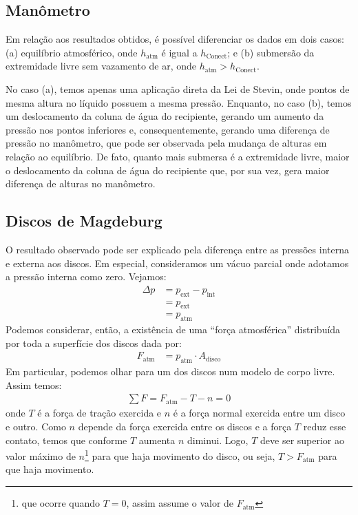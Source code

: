 \subsection{Manômetro}

Em relação aos resultados obtidos, é possível diferenciar os dados em dois
casos: (a) equilíbrio atmosférico, onde \( h_{\text{atm}} \) é igual a \(
h_{\text{Conect}} \); e (b) submersão da extremidade livre sem vazamento de ar,
onde \( h_{\text{atm}} > h_{\text{Conect}}\). 

No caso (a), temos apenas uma aplicação direta da Lei de Stevin, onde pontos de
mesma altura no líquido possuem a mesma pressão. Enquanto, no caso (b), temos um
deslocamento da coluna de água do recipiente, gerando um aumento da pressão nos
pontos inferiores e, consequentemente, gerando uma diferença de pressão no
manômetro, que pode ser observada pela mudança de alturas em relação ao
equilíbrio. De fato, quanto mais submersa é a extremidade livre, maior o
deslocamento da coluna de água do recipiente que, por sua vez, gera maior
diferença de alturas no manômetro.

\subsection{Discos de Magdeburg}

O resultado observado pode ser explicado pela diferença entre as pressões
interna e externa aos discos. Em especial, consideramos um vácuo parcial onde
adotamos a pressão interna como zero. Vejamos:
\begin{align*}
    \Delta p &= p_{\text{ext}} - p_{\text{int}}\\
    &= p_{\text{ext}}\\
    &= p_{\text{atm}}
\end{align*}
Podemos considerar, então, a existência de uma ``força atmosférica'' distribuída
por toda a superfície dos discos dada por:
\begin{align*}
    F_{\text{atm}} &= p_{\text{atm}} \cdot A_{\text{disco}}
\end{align*}
Em particular, podemos olhar para um dos discos num modelo de corpo livre.
Assim temos:
\begin{align*}
    \sum F = F_{\text{atm}} - T - n = 0
\end{align*}
onde \( T \) é a força de tração exercida e \( n \) é a força normal exercida
entre um disco e outro. Como \( n \) depende da força exercida entre os
discos e a força \( T \) reduz esse contato, temos que conforme \( T \) aumenta
\( n \) diminui. Logo, \( T \) deve ser superior ao valor máximo de \( n
\)\footnote{que ocorre quando \( T=0 \), assim assume o valor de
\(F_{\text{atm}}\)} para que haja movimento do disco, ou seja, 
\( T > F_{\text{atm}} \) para que haja movimento.

